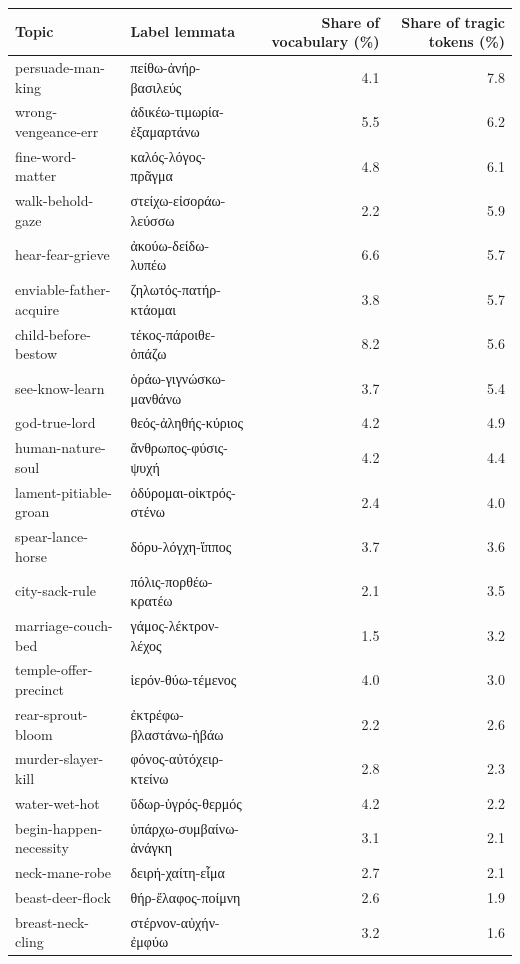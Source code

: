 \begin{table}[htbp]
\centering
\footnotesize
\begin{tabular*}{\textwidth}{@{\extracolsep{\fill}}llrr}
\toprule
Topic & Label lemmata & Share of vocabulary (\%) & Share of tragic tokens (\%) \\
\midrule
persuade-man-king & πείθω-ἀνήρ-βασιλεύς & 4.1 & 7.8 \\
wrong-vengeance-err & ἀδικέω-τιμωρία-ἐξαμαρτάνω & 5.5 & 6.2 \\
fine-word-matter & καλός-λόγος-πρᾶγμα & 4.8 & 6.1 \\
walk-behold-gaze & στείχω-εἰσοράω-λεύσσω & 2.2 & 5.9 \\
hear-fear-grieve & ἀκούω-δείδω-λυπέω & 6.6 & 5.7 \\
enviable-father-acquire & ζηλωτός-πατήρ-κτάομαι & 3.8 & 5.7 \\
child-before-bestow & τέκος-πάροιθε-ὀπάζω & 8.2 & 5.6 \\
see-know-learn & ὁράω-γιγνώσκω-μανθάνω & 3.7 & 5.4 \\
god-true-lord & θεός-ἀληθής-κύριος & 4.2 & 4.9 \\
human-nature-soul & ἄνθρωπος-φύσις-ψυχή & 4.2 & 4.4 \\
lament-pitiable-groan & ὀδύρομαι-οἰκτρός-στένω & 2.4 & 4.0 \\
spear-lance-horse & δόρυ-λόγχη-ἵππος & 3.7 & 3.6 \\
city-sack-rule & πόλις-πορθέω-κρατέω & 2.1 & 3.5 \\
marriage-couch-bed & γάμος-λέκτρον-λέχος & 1.5 & 3.2 \\
temple-offer-precinct & ἱερόν-θύω-τέμενος & 4.0 & 3.0 \\
rear-sprout-bloom & ἐκτρέφω-βλαστάνω-ἡβάω & 2.2 & 2.6 \\
murder-slayer-kill & φόνος-αὐτόχειρ-κτείνω & 2.8 & 2.3 \\
water-wet-hot & ὕδωρ-ὑγρός-θερμός & 4.2 & 2.2 \\
begin-happen-necessity & ὑπάρχω-συμβαίνω-ἀνάγκη & 3.1 & 2.1 \\
neck-mane-robe & δειρή-χαίτη-εἷμα & 2.7 & 2.1 \\
beast-deer-flock & θήρ-ἔλαφος-ποίμνη & 2.6 & 1.9 \\
breast-neck-cling & στέρνον-αὐχήν-ἐμφύω & 3.2 & 1.6 \\

\end{tabular*}
\end{table}
